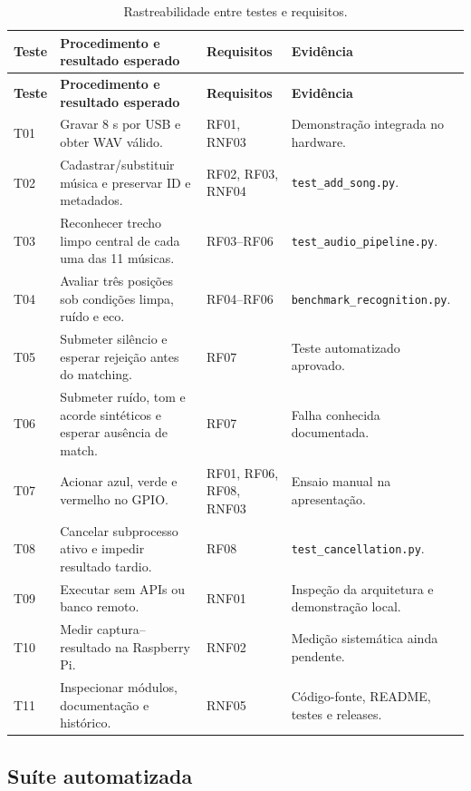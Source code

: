 \documentclass[12pt,a4paper]{article}
\newcommand{\caminho}[1]{\nolinkurl{#1}}
\begin{document}
\begin{longtable}{C{1.0cm} p{5.0cm} p{3.0cm} p{4.7cm}}
    \caption{Rastreabilidade entre testes e requisitos.}\label{tab:rastreio}\\
    \toprule
    \textbf{Teste} & \textbf{Procedimento e resultado esperado} &
    \textbf{Requisitos} & \textbf{Evidência}\\
    \midrule
    \endfirsthead
    \toprule
    \textbf{Teste} & \textbf{Procedimento e resultado esperado} &
    \textbf{Requisitos} & \textbf{Evidência}\\
    \midrule
    \endhead
    \bottomrule
    \endfoot
    T01 & Gravar 8 s por USB e obter WAV válido. & RF01, RNF03 &
    Demonstração integrada no hardware.\\
    T02 & Cadastrar/substituir música e preservar ID e metadados. &
    RF02, RF03, RNF04 & \caminho{test_add_song.py}.\\
    T03 & Reconhecer trecho limpo central de cada uma das 11 músicas. &
    RF03--RF06 & \caminho{test_audio_pipeline.py}.\\
    T04 & Avaliar três posições sob condições limpa, ruído e eco. &
    RF04--RF06 & \caminho{benchmark_recognition.py}.\\
    T05 & Submeter silêncio e esperar rejeição antes do matching. & RF07 &
    Teste automatizado aprovado.\\
    T06 & Submeter ruído, tom e acorde sintéticos e esperar ausência de match. &
    RF07 & Falha conhecida documentada.\\
    T07 & Acionar azul, verde e vermelho no GPIO. & RF01, RF06, RF08, RNF03 &
    Ensaio manual na apresentação.\\
    T08 & Cancelar subprocesso ativo e impedir resultado tardio. & RF08 &
    \caminho{test_cancellation.py}.\\
    T09 & Executar sem APIs ou banco remoto. & RNF01 &
    Inspeção da arquitetura e demonstração local.\\
    T10 & Medir captura--resultado na Raspberry Pi. & RNF02 &
    Medição sistemática ainda pendente.\\
    T11 & Inspecionar módulos, documentação e histórico. & RNF05 &
    Código-fonte, README, testes e releases.\\
\end{longtable}

\subsection{Suíte automatizada}
\end{document}
